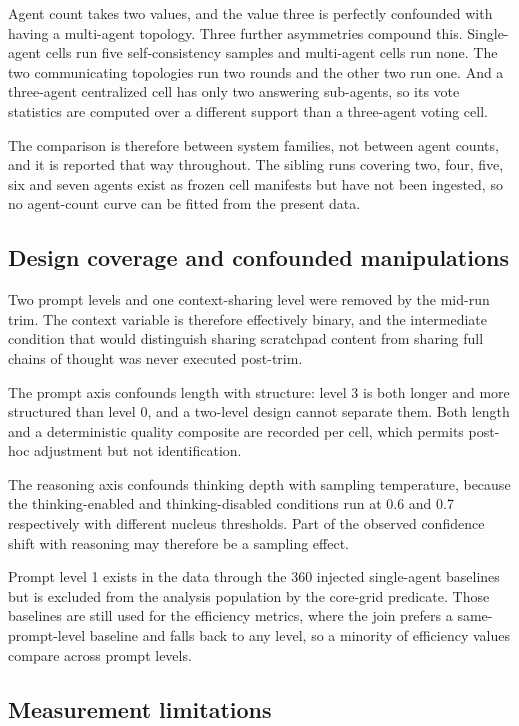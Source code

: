 Agent count takes two values, and the value three is perfectly confounded with having a
multi-agent topology. Three further asymmetries compound this. Single-agent cells run five
self-consistency samples and multi-agent cells run none. The two communicating topologies
run two rounds and the other two run one. And a three-agent centralized cell has only two
answering sub-agents, so its vote statistics are computed over a different support than a
three-agent voting cell.

The comparison is therefore between system families, not between agent counts, and it is
reported that way throughout. The sibling runs covering two, four, five, six and seven
agents exist as frozen cell manifests but have not been ingested, so no agent-count curve
can be fitted from the present data.

\subsection{Design coverage and confounded manipulations}

Two prompt levels and one context-sharing level were removed by the mid-run trim. The
context variable is therefore effectively binary, and the intermediate condition that would
distinguish sharing scratchpad content from sharing full chains of thought was never
executed post-trim.

The prompt axis confounds length with structure: level 3 is both longer and more structured
than level 0, and a two-level design cannot separate them. Both length and a deterministic
quality composite are recorded per cell, which permits post-hoc adjustment but not
identification.

The reasoning axis confounds thinking depth with sampling temperature, because the
thinking-enabled and thinking-disabled conditions run at 0.6 and 0.7 respectively with
different nucleus thresholds. Part of the observed confidence shift with reasoning may
therefore be a sampling effect.

Prompt level 1 exists in the data through the 360 injected single-agent baselines but is
excluded from the analysis population by the core-grid predicate. Those baselines are still
used for the efficiency metrics, where the join prefers a same-prompt-level baseline and
falls back to any level, so a minority of efficiency values compare across prompt levels.

\subsection{Measurement limitations}

